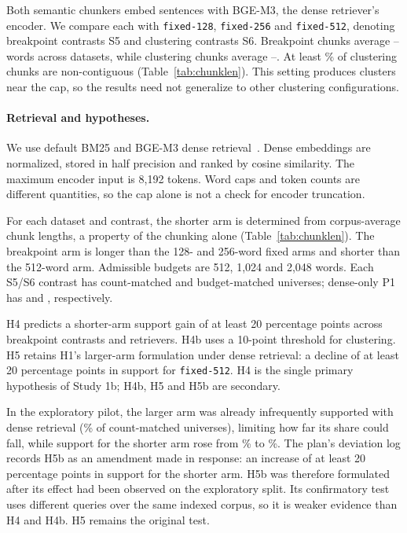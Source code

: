 \documentclass[11pt]{article}
\newcommand{\chunk}[1]{\texttt{#1}}
\begin{document}
Both semantic chunkers embed sentences with BGE-M3, the dense retriever's encoder. We compare each with \chunk{fixed-128}, \chunk{fixed-256} and \chunk{fixed-512}, denoting breakpoint contrasts S5 and clustering contrasts S6. Breakpoint chunks average \SemBpMin--\SemBpMax{} words across datasets, while clustering chunks average \SemClMin--\SemClMax{}. At least \SemClNoncontigMin\% of clustering chunks are non-contiguous (Table~\ref{tab:chunklen}). This setting produces clusters near the cap, so the results need not generalize to other clustering configurations.

\paragraph{Retrieval and hypotheses.}
We use default BM25 and BGE-M3 dense retrieval~\cite{chen2024bgem3}. Dense embeddings are normalized, stored in half precision and ranked by cosine similarity. The maximum encoder input is 8,192 tokens. Word caps and token counts are different quantities, so the cap alone is not a check for encoder truncation.

For each dataset and contrast, the shorter arm is determined from corpus-average chunk lengths, a property of the chunking alone (Table~\ref{tab:chunklen}). The breakpoint arm is longer than the 128- and 256-word fixed arms and shorter than the 512-word arm. Admissible budgets are 512, 1,024 and 2,048 words. Each S5/S6 contrast has \SfiveUniversesCount{} count-matched and \SfiveUniversesBudget{} budget-matched universes; dense-only P1 has \PoneDenseUniversesCount{} and \PoneDenseUniversesBudget{}, respectively.

H4 predicts a shorter-arm support gain of at least 20 percentage points across breakpoint contrasts and retrievers. H4b uses a 10-point threshold for clustering. H5 retains H1's larger-arm formulation under dense retrieval: a decline of at least 20 percentage points in support for \chunk{fixed-512}. H4 is the single primary hypothesis of Study 1b; H4b, H5 and H5b are secondary.

In the exploratory pilot, the larger arm was already infrequently supported with dense retrieval (\HFivePilotCountFiveTwelve\% of count-matched universes), limiting how far its share could fall, while support for the shorter arm rose from \HFiveBPilotCount\% to \HFiveBPilotBudget\%. The plan's deviation log records H5b as an amendment made in response: an increase of at least 20 percentage points in support for the shorter arm. H5b was therefore formulated after its effect had been observed on the exploratory split. Its confirmatory test uses different queries over the same indexed corpus, so it is weaker evidence than H4 and H4b. H5 remains the original test.
\end{document}
